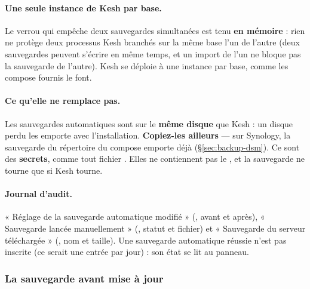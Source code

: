 \documentclass[a4paper,11pt,oneside]{article}
\begin{document}
\paragraph{Une seule instance de Kesh par base.} Le verrou qui empêche deux sauvegardes simultanées est tenu \textbf{en mémoire} : rien ne protège deux processus Kesh branchés sur la même base l'un de l'autre (deux sauvegardes peuvent s'écrire en même temps, et un import de l'un ne bloque pas la sauvegarde de l'autre). Kesh se déploie à une instance par base, comme les compose fournis le font.

\paragraph{Ce qu'elle ne remplace pas.} Les sauvegardes automatiques sont sur le \textbf{même disque} que Kesh : un disque perdu les emporte avec l'installation. \textbf{Copiez-les ailleurs} --- sur Synology, la sauvegarde du répertoire du compose emporte déjà  (\S\ref{sec:backup-dsm}). Ce sont des \textbf{secrets}, comme tout fichier . Elles ne contiennent pas le , et la sauvegarde ne tourne que si Kesh tourne.

\paragraph{Journal d'audit.} « Réglage de la sauvegarde automatique modifié » (, avant et après), « Sauvegarde lancée manuellement » (, statut et fichier) et « Sauvegarde du serveur téléchargée » (, nom et taille). Une sauvegarde automatique réussie n'est pas inscrite (ce serait une entrée par jour) : son état se lit au panneau.

\subsubsection{La sauvegarde avant mise à jour}\label{sec:sauvegarde-avant-maj}
\end{document}
